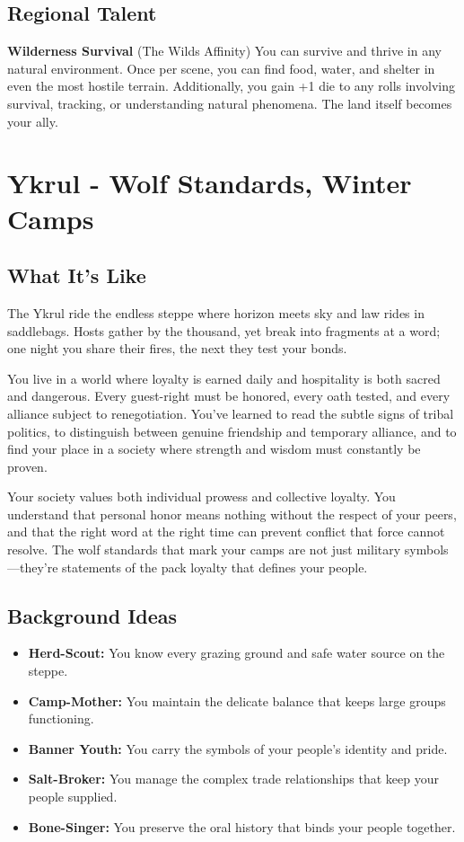 \documentclass[11pt]{article}
\newcommand{\region}[1]{\section*{#1}}
\newcommand{\subregion}[1]{\subsection*{#1}}
\begin{document}
\begin{multicols}{2}
\subregion{Regional Talent}

\textbf{Wilderness Survival} (The Wilds Affinity)
You can survive and thrive in any natural environment. Once per scene, you can find food, water, and shelter in even the most hostile terrain. Additionally, you gain +1 die to any rolls involving survival, tracking, or understanding natural phenomena. The land itself becomes your ally.

\end{multicols}

\region{Ykrul - Wolf Standards, Winter Camps}

\begin{multicols}{2}
\subregion{What It's Like}

The Ykrul ride the endless steppe where horizon meets sky and law rides in saddlebags. Hosts gather by the thousand, yet break into fragments at a word; one night you share their fires, the next they test your bonds.

You live in a world where loyalty is earned daily and hospitality is both sacred and dangerous. Every guest-right must be honored, every oath tested, and every alliance subject to renegotiation. You've learned to read the subtle signs of tribal politics, to distinguish between genuine friendship and temporary alliance, and to find your place in a society where strength and wisdom must constantly be proven.

Your society values both individual prowess and collective loyalty. You understand that personal honor means nothing without the respect of your peers, and that the right word at the right time can prevent conflict that force cannot resolve. The wolf standards that mark your camps are not just military symbols—they're statements of the pack loyalty that defines your people.

\columnbreak

\subregion{Background Ideas}

\begin{itemize}[leftmargin=*]
    \item \textbf{Herd-Scout:} You know every grazing ground and safe water source on the steppe.
    \item \textbf{Camp-Mother:} You maintain the delicate balance that keeps large groups functioning.
    \item \textbf{Banner Youth:} You carry the symbols of your people's identity and pride.
    \item \textbf{Salt-Broker:} You manage the complex trade relationships that keep your people supplied.
    \item \textbf{Bone-Singer:} You preserve the oral history that binds your people together.
\end{itemize}


\end{multicols}
\end{document}
